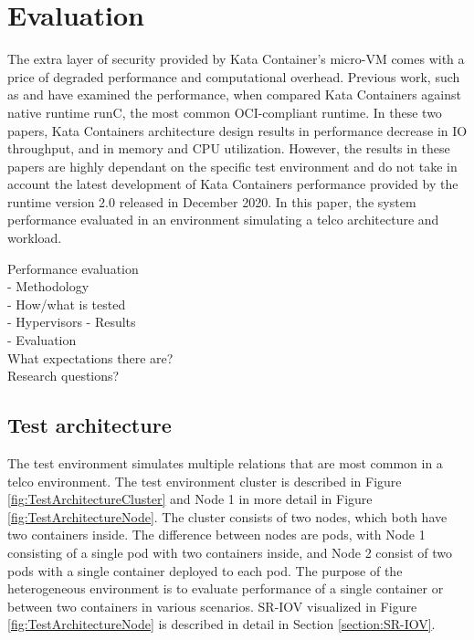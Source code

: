 \chapter{Evaluation}
\label{chapter:evaluation}

The extra layer of security provided by Kata Container's micro-VM comes with a price of degraded performance and computational overhead. Previous work, such as \cite{Kumar2020} and \cite{EverartsdeVelp2020} have examined the performance, when compared Kata Containers against native runtime runC, the most common OCI-compliant runtime. In these two papers, Kata Containers architecture design results in performance decrease in IO throughput, and in memory and CPU utilization. However, the results in these papers are highly dependant on the specific test environment and do not take in account the latest development of Kata Containers performance provided by the runtime version 2.0 released in December 2020. In this paper, the system performance evaluated in an environment simulating a telco architecture and workload.


Performance evaluation \\
- Methodology \\
- How/what is tested \\
    - Hypervisors
- Results \\
- Evaluation \\
What expectations there are? \\
Research questions?

\section{Test architecture}
\label{section:test_architecture}

The test environment simulates multiple relations that are most common in a telco environment. The test environment cluster is described in Figure \ref{fig:TestArchitectureCluster} and Node 1 in more detail in Figure \ref{fig:TestArchitectureNode}. The cluster consists of two nodes, which both have two containers inside. The difference between nodes are pods, with Node 1 consisting of a single pod with two containers inside, and Node 2 consist of two pods with a single container deployed to each pod. The purpose of the heterogeneous environment is to evaluate performance of a single container or between two containers in various scenarios. SR-IOV visualized in Figure \ref{fig:TestArchitectureNode} is described in detail in Section \ref{section:SR-IOV}.

